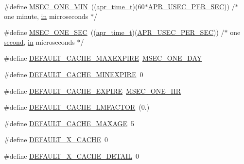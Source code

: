 \begin{DoxyCompactItemize}
\#define \hyperlink{group__Cache__util_ga06c93f90cd6b42720767c458a27ba49c}{M\+S\+E\+C\+\_\+\+O\+N\+E\+\_\+\+M\+IN}~((\hyperlink{group__apr__time_gadb4bde16055748190eae190c55aa02bb}{apr\+\_\+time\+\_\+t})(60$\ast$\hyperlink{group__apr__time_gab4dd3f3015d25a50f3be3e0e91043abf}{A\+P\+R\+\_\+\+U\+S\+E\+C\+\_\+\+P\+E\+R\+\_\+\+S\+EC}))    /$\ast$ one minute, \hyperlink{group__apr__thread__proc_ga2e46fea00cc2238744ebca5061c62bcc}{in} microseconds $\ast$/
\item 
\#define \hyperlink{group__Cache__util_ga99bdcd9c38d9afadf961bf71103fb44e}{M\+S\+E\+C\+\_\+\+O\+N\+E\+\_\+\+S\+EC}~((\hyperlink{group__apr__time_gadb4bde16055748190eae190c55aa02bb}{apr\+\_\+time\+\_\+t})(\hyperlink{group__apr__time_gab4dd3f3015d25a50f3be3e0e91043abf}{A\+P\+R\+\_\+\+U\+S\+E\+C\+\_\+\+P\+E\+R\+\_\+\+S\+EC}))       /$\ast$ one \hyperlink{group__apr__tables_gade8df35e4d83c24788cf409262f7fc51}{second}, \hyperlink{group__apr__thread__proc_ga2e46fea00cc2238744ebca5061c62bcc}{in} microseconds $\ast$/
\item 
\#define \hyperlink{group__Cache__util_gadfe1ae1ee42160d9c183cfac20c25ad1}{D\+E\+F\+A\+U\+L\+T\+\_\+\+C\+A\+C\+H\+E\+\_\+\+M\+A\+X\+E\+X\+P\+I\+RE}~\hyperlink{group__Cache__util_ga11c1c155b3b983d8a53ee6f62d054c5c}{M\+S\+E\+C\+\_\+\+O\+N\+E\+\_\+\+D\+AY}
\item 
\#define \hyperlink{group__Cache__util_ga1777581186d443f1a84aad75245f526e}{D\+E\+F\+A\+U\+L\+T\+\_\+\+C\+A\+C\+H\+E\+\_\+\+M\+I\+N\+E\+X\+P\+I\+RE}~0
\item 
\#define \hyperlink{group__Cache__util_ga4a4dac2e0dccccc4f1e4485bfc529724}{D\+E\+F\+A\+U\+L\+T\+\_\+\+C\+A\+C\+H\+E\+\_\+\+E\+X\+P\+I\+RE}~\hyperlink{group__Cache__util_ga99f59d6743883a270e59e4d49616b054}{M\+S\+E\+C\+\_\+\+O\+N\+E\+\_\+\+HR}
\item 
\#define \hyperlink{group__Cache__util_ga3a7f13c74ab54bb2ec8419463f95fa1d}{D\+E\+F\+A\+U\+L\+T\+\_\+\+C\+A\+C\+H\+E\+\_\+\+L\+M\+F\+A\+C\+T\+OR}~(0.)
\item 
\#define \hyperlink{group__Cache__util_gab7892c35c420dde1a8050b5bd7c437c5}{D\+E\+F\+A\+U\+L\+T\+\_\+\+C\+A\+C\+H\+E\+\_\+\+M\+A\+X\+A\+GE}~5
\item 
\#define \hyperlink{group__Cache__util_ga201e22bbaa4aa67b58a109afaabf6959}{D\+E\+F\+A\+U\+L\+T\+\_\+\+X\+\_\+\+C\+A\+C\+HE}~0
\item 
\#define \hyperlink{group__Cache__util_ga5774f5c44b82783922fe3c741cb4c093}{D\+E\+F\+A\+U\+L\+T\+\_\+\+X\+\_\+\+C\+A\+C\+H\+E\+\_\+\+D\+E\+T\+A\+IL}~0
\item 

\end{DoxyCompactItemize}
